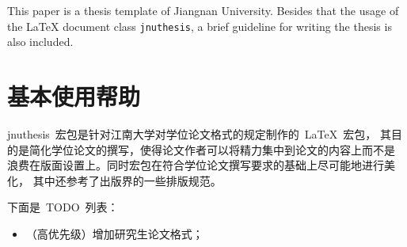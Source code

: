 \documentclass[pdftex, twoside, bachelor]{JNUthesis}
\begin{document}
\begin{spacing}{1.25}
\begin{abstract}

本文是江南大学学位论文的~\LaTeX{}~模板。目前不支持研究生学位论文格式。

除了介绍~\LaTeX{}~文档类~\texttt{jnuthesis}~的用法外，本文还是一
个简要的学位论文写作指南。


\end{abstract}
\pagestyle{abstract}

\begin{englishabstract}

This paper is a thesis template of Jiangnan University. Besides that
the usage of the \LaTeX{} document class \texttt{jnuthesis}, a brief
guideline for writing the thesis is also included.


\end{englishabstract}
\pagestyle{englishabstract}

\clearpage
\pagestyle{plain}
\tableofcontents



\mainmatter

\makeatletter
  \let\ps@plain\ps@main
\makeatother
\pagestyle{main}


\chapter{基本使用帮助}
\label{C:intro}

jnuthesis~宏包是针对江南大学对学位论文格式的规定制作的~\LaTeX{}~宏包，
其目的是简化学位论文的撰写，使得论文作者可以将精力集中到论文的内容上而不是
浪费在版面设置上。同时宏包在符合学位论文撰写要求的基础上尽可能地进行美化，
其中还参考了出版界的一些排版规范。

下面是~TODO~列表：

\begin{itemize}

\item （高优先级）增加研究生论文格式；


\end{itemize}
\end{spacing}
\end{document}
